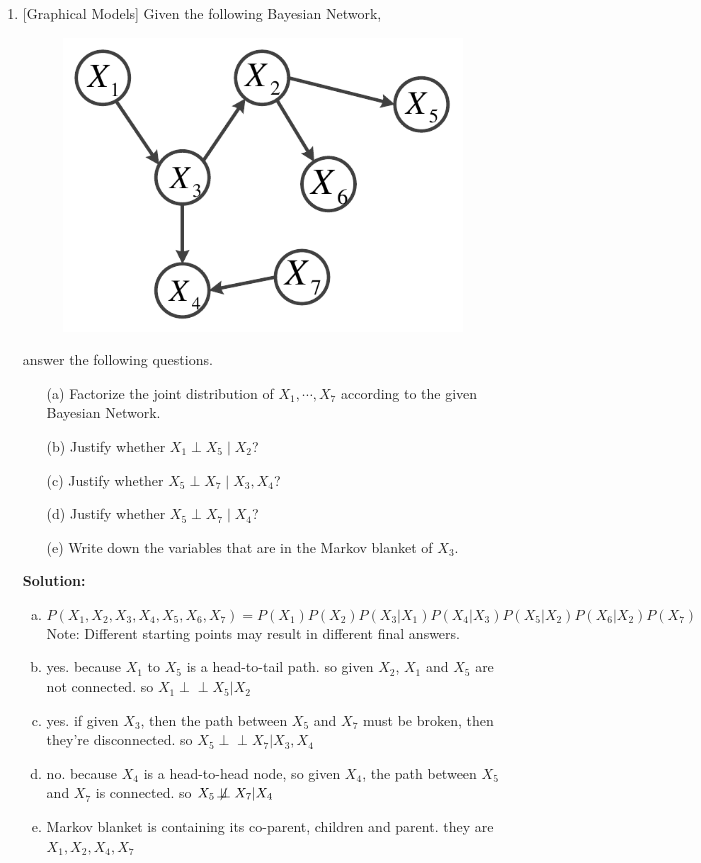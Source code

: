 \documentclass[10pt]{article}
\begin{document}
\begin{enumerate}[1.]
	\item {} [Graphical Models]
	Given the following Bayesian Network, 
	\begin{figure}[h]
		\label{fig:bn}
		\vskip 0.2in
		\begin{center}
		\centerline{\includegraphics[width=0.4\columnwidth]{figures/bn}}
		\end{center}
		\vskip -0.2in
	\end{figure}

	answer the following questions.
		\begin{itemize}
			\item[(a)] Factorize the joint distribution of $X_{1},\cdots,X_{7}$ according 
			to the given Bayesian Network.~ 
			\item[(b)] Justify whether $X_{1}\perp X_{5}\mid X_{2}$?~ 
			\item[(c)] Justify whether $X_{5}\perp X_{7}\mid X_{3},X_{4}$?~ 
			\item[(d)] Justify whether $X_{5}\perp X_{7}\mid X_{4}$?~ 
			\item[(e)] Write down the variables that are in the Markov blanket of $X_{3}$.~ 
		\end{itemize}

		\textbf{Solution:}
		\begin{enumerate}[(a)]
			\item 
			$$P(X_1,X_2,X_3,X_4,X_5,X_6,X_7)=P(X_1)P(X_2)P(X_3|X_1)P(X_4|X_3)P(X_5|X_2)P(X_6|X_2)P(X_7)$$
			Note: Different starting points may result in different final answers.
			\item 
			yes. because $X_1$ to $X_5$ is a head-to-tail path. so given $X_2$, $X_1$ and $X_5$ are not connected. so $X_1\perp\!\!\!\perp X_5|X_2$
			\item 
			yes. if given $X_3$, then the path between $X_5$ and $X_7$ must be broken, then they're disconnected. so $X_5\perp\!\!\!\perp X_7|X_3,X_4$
			\item 
			no. because $X_4$ is a head-to-head node, so given $X_4$, the path between $X_5$ and $X_7$ is connected. so $X_5\not\!\perp\!\!\!\perp X_7|X_4$
			\item 
			Markov blanket is containing its co-parent, children and parent. they are $X_1,X_2,X_4,X_7$
		\end{enumerate}

\end{enumerate}
\end{document}
